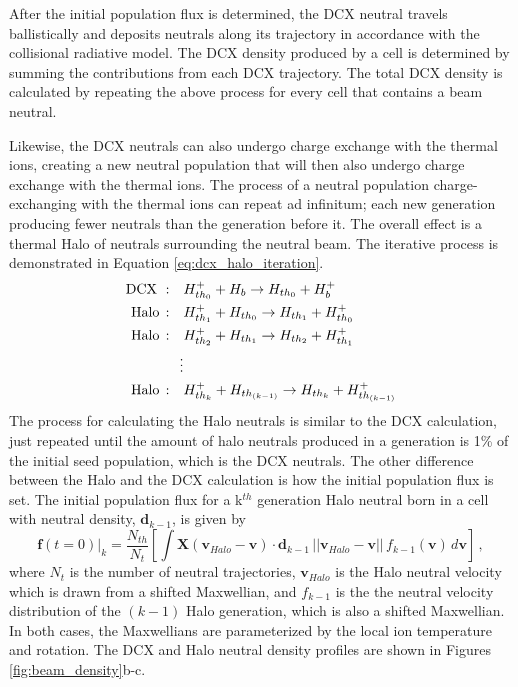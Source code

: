 After the initial population flux is determined, the DCX neutral travels ballistically and deposits neutrals along its trajectory in accordance with the collisional radiative model. The DCX density produced by a cell is determined by summing the contributions from each DCX trajectory. The total DCX density is calculated by repeating the above process for every cell that contains a beam neutral.

Likewise, the DCX neutrals can also undergo charge exchange with the thermal ions, creating a new neutral population that will then also undergo charge exchange with the thermal ions. The process of a neutral population charge-exchanging with the thermal ions can repeat ad infinitum; each new generation producing fewer neutrals than the generation before it. The overall effect is a thermal Halo of neutrals surrounding the neutral beam. The iterative process is demonstrated in Equation \ref{eq:dcx_halo_iteration}.
\begin{equation}\label{eq:dcx_halo_iteration}
\begin{split}
\rm{DCX\,\,:} \quad &H_{th_0}^+ + H_b \rightarrow H_{th_0} + H_b^+\\
\rm{Halo\,:} \quad &H_{th_1}^+ + H_{th_0} \rightarrow H_{th_1} + H_{th_0}^+\\
\rm{Halo\,:} \quad &H_{th_2}^+ + H_{th_1} \rightarrow H_{th_2} + H_{th_1}^+ \\
\vdots \\
\rm{Halo\,:} \quad &H_{th_k}^+ + H_{th_{(k-1)}} \rightarrow H_{th_k} + H_{th_{(k-1)}}^+
\end{split}
\end{equation}
The process for calculating the Halo neutrals is similar to the DCX calculation, just repeated until the amount of halo neutrals produced in a generation is 1\% of the initial seed population, which is the DCX neutrals. The other difference between the Halo and the DCX calculation is how the initial population flux is set.
The initial population flux for a k$^{th}$ generation Halo neutral born in a cell with neutral density, $\mathbf{d}_{k-1}$, is given by
\begin{equation} \label{eq:dcx_rates}
    \mathbf{f}(t=0)|_k = \frac{N_{th}}{N_{t}} \left [ \int \mathbf{X}(\mathbf{v}_{Halo} - \mathbf{v}) \cdot \mathbf{d}_{k-1}\, ||\mathbf{v}_{Halo} - \mathbf{v}||\, f_{k-1}(\mathbf{v})\, d\mathbf{v} \right ]\,,
\end{equation}
where $N_{t}$ is the number of neutral trajectories, $\mathbf{v}_{Halo}$ is the Halo neutral velocity which is drawn from a shifted Maxwellian, and $f_{k-1}$ is the the neutral velocity distribution of the $(k-1)$ Halo generation, which is also a shifted Maxwellian. In both cases, the Maxwellians are parameterized by the local ion temperature and rotation.
The DCX and Halo neutral density profiles are shown in Figures \ref{fig:beam_density}b-c.

